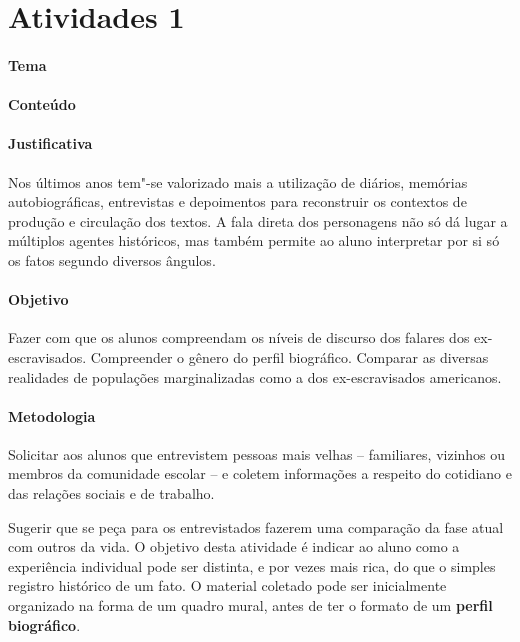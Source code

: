 \documentclass[11pt]{extarticle}
\begin{document}
\tableofcontents

\section{Atividades 1}




\paragraph{Tema} %
\paragraph{Conteúdo}

\paragraph{Justificativa}
  Nos últimos anos tem"-se valorizado mais a utilização de diários,
  memórias autobiográficas, entrevistas e depoimentos para reconstruir
  os contextos de produção e circulação dos textos. A fala direta 
  dos personagens não só dá lugar a múltiplos agentes históricos, 
  mas também permite ao aluno interpretar por si só os fatos segundo diversos 
  ângulos.

\paragraph{Objetivo} Fazer com que os alunos compreendam os níveis de 
discurso dos falares dos ex-escravisados. Compreender o gênero do perfil 
biográfico. Comparar as diversas realidades de populações 
marginalizadas como a dos ex-escravisados americanos. 


\paragraph{Metodologia}

Solicitar aos alunos
  que entrevistem pessoas mais velhas -- familiares, vizinhos ou membros
  da comunidade escolar -- e coletem informações a respeito do cotidiano
  e das relações sociais e de trabalho. 

Sugerir que se peça para os
  entrevistados fazerem uma comparação da fase atual com outros da vida.
  O objetivo desta atividade é indicar ao aluno como a experiência
  individual pode ser distinta, e por vezes mais rica, do que o simples
  registro histórico de um fato. O material coletado pode ser
  inicialmente organizado na forma de um quadro mural, antes de ter o
  formato de um \textbf{perfil biográfico}. 
\end{document}
